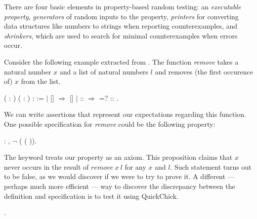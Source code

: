 There are four basic elements in property-based random testing: an \emph{executable property}, \emph{generators} of random inputs to the property, \emph{printers} for converting data structures like numbers to strings when reporting counterexamples, and \emph{shrinkers}, which are used to search for minimal counterexamples when errors occur.

Consider the following example extracted from . The function \emph{remove} takes a natural number $ x $ and a list of natural numbers $ l $ and removes (the first occurence of) $ x $ from the list.

\begin{coqdoccode}
	\coqdocnoindent
	  ( : ) ( :  ) :   :=\coqdoceol
	\coqdocindent{1.00em}
	  \coqdoceol
	\coqdocindent{2.00em}
	\ensuremath{|} []   \ensuremath{\Rightarrow} []\coqdoceol
	\coqdocindent{2.00em}
	\ensuremath{|} :: \ensuremath{\Rightarrow}   =?      ::   \coqdoceol
	\coqdocindent{1.00em}
	.\coqdoceol
\end{coqdoccode}

We can write assertions that represent our expectations regarding this function. One possible specification for \emph{remove} could be the following property:

\begin{coqdoccode}
	\coqdocnoindent
	  : \coqdockw{\ensuremath{\forall}}  ,  \ensuremath{\lnot} (  (  )).\coqdoceol
\end{coqdoccode}

The keyword  treats our property  as an axiom. This proposition claims that $ x $ never occurs in the result of $ \mathit{remove} \ x \ l $ for any $ x $ and $ l $. Such statement turns out to be false, as we would discover if we were to try to prove it. A different — perhaps much more efficient — way to discover the discrepancy between the definition and specification is to test it using QuickChick.

\begin{coqdoccode}
	\coqdocnoindent
	 .\coqdoceol
\end{coqdoccode}

